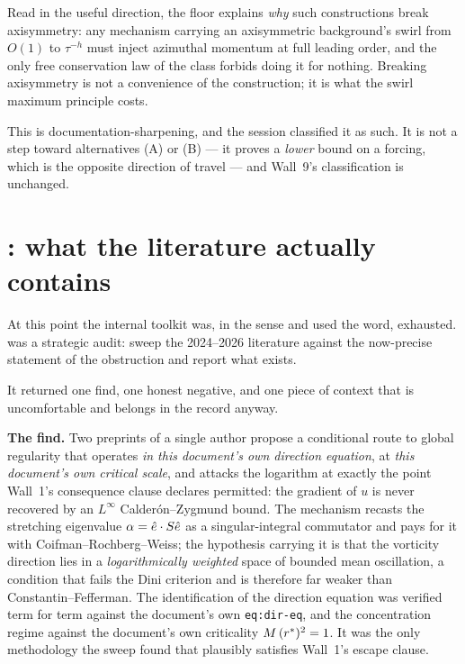 \begin{obsv}
\label{obs:pt-wall9-sharp}
Read in the useful direction, the floor explains \emph{why} such constructions
break axisymmetry: any mechanism carrying an axisymmetric background's swirl
from \(O(1)\) to \(\tau^{-h}\) must inject azimuthal momentum at full leading
order, and the only free conservation law of the class forbids doing it for
nothing. Breaking axisymmetry is not a convenience of the construction; it is
what the swirl maximum principle costs.

\smallskip
This is documentation-sharpening, and the session classified it as such. It is
not a step toward alternatives (A) or (B) --- it proves a \emph{lower} bound on
a forcing, which is the opposite direction of travel --- and Wall~9's
classification is unchanged.
\end{obsv}

\section{\texorpdfstring{: what the literature actually contains}{S56: what the literature actually contains}}
\label{sec:pt-s56}

At this point the internal toolkit was, in the sense  and  used
the word, exhausted.  was a strategic audit: sweep the 2024--2026
literature against the now-precise statement of the obstruction and report what
exists.

It returned one find, one honest negative, and one piece of context that is
uncomfortable and belongs in the record anyway.

\textbf{The find.} Two preprints of a single author propose a conditional route
to global regularity that operates \emph{in this document's own direction
equation}, at \emph{this document's own critical scale}, and attacks the
logarithm at exactly the point Wall~1's consequence clause declares permitted:
the gradient of \(u\) is never recovered by an \(L^\infty\)
Calder\'on--Zygmund bound. The mechanism recasts the stretching eigenvalue
\(\alpha=\hat{e}\cdot S\hat{e}\) as a singular-integral commutator and pays for it
with Coifman--Rochberg--Weiss; the hypothesis carrying it is that the vorticity
direction lies in a \emph{logarithmically weighted} space of bounded mean
oscillation, a condition that fails the Dini criterion and is therefore far
weaker than Constantin--Fefferman. The identification of the direction equation
was verified term for term against the document's own \texttt{eq:dir-eq}, and
the concentration regime against the document's own criticality
\(M\,(r^{*})^2=1\). It was the only methodology the sweep found that
plausibly satisfies Wall~1's escape clause.

